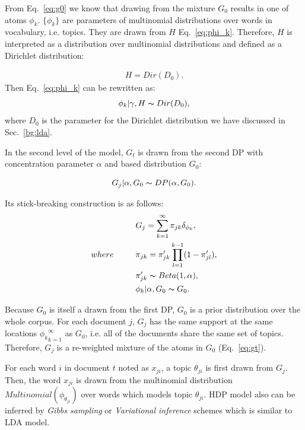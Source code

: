 From Eq.~\eqref{eq:g0} we know that drawing from the mixture $G_0$ results in one of atoms $\phi_k$. $\{\phi_k\}$ are parameters of multinomial distributions over words in vocabulary, i.e. topics. They are drawn from $H$ Eq.~\eqref{eq:phi_k}. Therefore, $H$ is interpreted as a distribution over multinomial distributions and defined as a Dirichlet distribution:

\begin{align*}
	H = Dir(D_0).
\end{align*}
Then Eq.~\eqref{eq:phi_k} can be rewritten as:
\begin{equation}
	\phi_k|\gamma,H  \thicksim Dir(D_0),
\end{equation}
where $D_0$ is the parameter for the Dirichlet distribution we have discussed in Sec.~\ref{bg:lda}.

In the second level of the model, $G_t$ is drawn from the second DP with concentration parameter $\alpha$ and based distribution $G_0$:

\begin{equation}
	G_j|\alpha,G_0 \thicksim DP(\alpha,G_0).
\end{equation}

Its stick-breaking construction is as follows:
\begin{align}
	\label{eq:gt}
	&G_j = \sum^\infty_{k=1}\pi _{jk}\delta_{\phi_k},\\
	where~~~~~~~~&\pi_{jk} =\pi _{jk}'\prod^{k-1}_{l=1}(1-\pi _{jl}'),\\
	&\pi_{jk}'\thicksim Beta(1,\alpha),\\
	&\phi_k|\alpha,G_0 \thicksim G_0.
\end{align}


Because $G_0$ is itself a drawn from the first DP, $G_0$ is a prior distribution over the whole corpus.
For each document $j$, $G_j$ has the same support at the same locations ${\phi_k}_{k=1}^{\infty}$ as $G_0$, i.e. all of the documents share the same set of topics. Therefore, $G_j$ is a re-weighted mixture of the atoms in $G_0$ (Eq.~\eqref{eq:gt}). 

For each word $i$ in document $t$ noted as $x_{ji}$, a topic $\theta_{ji}$ is first drawn from $G_j$. Then, the word $x_{ji}$ is drawn from the multinomial distribution $Multinomial(\phi_{\theta_{ji}})$ over words which models topic $\theta_{ji}$.
HDP model also can be inferred by \emph{Gibbs sampling} or \emph{Variational inference} schemes which is similar to LDA model.

